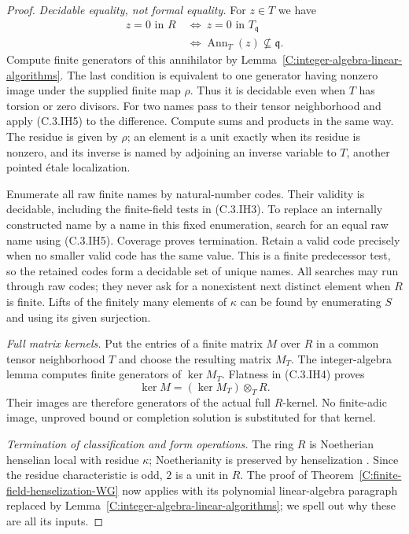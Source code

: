 \begin{proof}
\emph{Decidable equality, not formal equality.}
For $z\in T$ we have
\[
 \begin{split}
 z=0\text{ in }R
 &\ \Longleftrightarrow\ z=0\text{ in }T_{\mathfrak q}\\
 &\ \Longleftrightarrow\operatorname{Ann}_T(z)
                                     \not\subseteq\mathfrak q.
 \end{split}                                             \tag{C.3.IH5}
\]
Compute finite generators of this annihilator by
Lemma~\ref{C:integer-algebra-linear-algorithms}.
The last condition is equivalent to one generator having nonzero image
under the supplied finite map $\rho$.
Thus it is decidable even when $T$ has torsion or zero divisors.
For two names pass to their tensor neighborhood and apply (C.3.IH5) to
the difference.  Compute sums and products in the same way.
The residue is given by $\rho$; an element is a unit exactly when its
residue is nonzero, and its inverse is named by adjoining an inverse
variable to $T$, another pointed \'etale localization.

Enumerate all raw finite names by natural-number codes.
Their validity is decidable, including the finite-field tests in
(C.3.IH3).  To replace an internally constructed name by a name in this
fixed enumeration, search for an equal raw name using (C.3.IH5).
Coverage proves termination.
Retain a valid code precisely when no smaller valid code has the same
value.  This is a finite predecessor test, so the retained codes form a
decidable set of unique names.  All searches may run through raw codes;
they never ask for a nonexistent next distinct element when $R$ is finite.
Lifts of the finitely many elements of $\kappa$ can be found by enumerating
$S$ and using its given surjection.

\emph{Full matrix kernels.}
Put the entries of a finite matrix $M$ over $R$ in a common tensor
neighborhood $T$ and choose the resulting matrix $M_T$.
The integer-algebra lemma computes finite generators of $\ker M_T$.
Flatness in (C.3.IH4) proves
\[
                   \ker M=(\ker M_T)\otimes_T R.         \tag{C.3.IH6}
\]
Their images are therefore generators of the actual full $R$-kernel.
No finite-adic image, unproved bound or completion solution is substituted
for that kernel.

\emph{Termination of classification and form operations.}
The ring $R$ is Noetherian henselian local with residue $\kappa$;
Noetherianity is preserved by henselization
\cite[Tag 06LJ, Lemma 15.46.3]{C-StacksHenselianEffective}.
Since the residue characteristic is odd, $2$ is a unit in $R$.
The proof of Theorem~\ref{C:finite-field-henselization-WG} now applies
with its polynomial linear-algebra paragraph replaced by
Lemma~\ref{C:integer-algebra-linear-algorithms}; we spell out why these
are all its inputs.


\end{proof}

